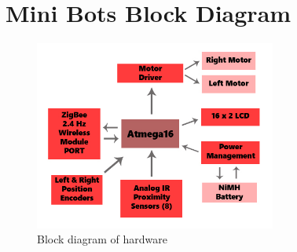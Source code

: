 \documentclass[a4paper,12pt,oneside]{book}
\begin{document}
	\chapter{Mini Bots Block Diagram}
	
	\begin{figure}[h!]
		\caption{Block diagram of hardware}
		\includegraphics[width=300px]{./Block_Diagram.jpg}
	\end{figure}
	\hfill\\
\end{document}
